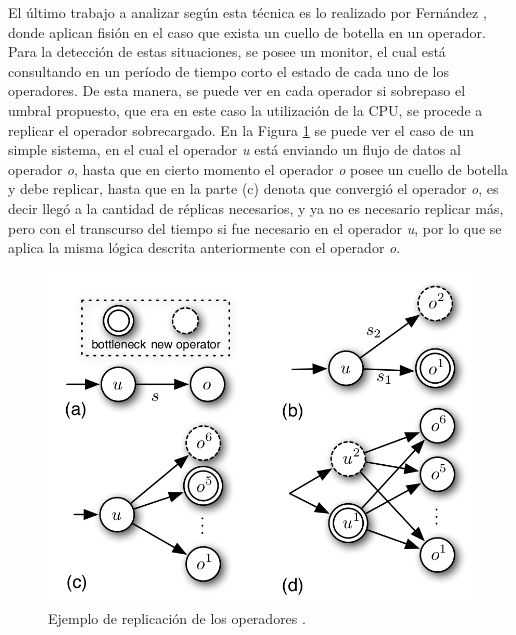 El último trabajo a analizar según esta técnica es lo realizado por Fernández \citep{FernandezMKP13}, donde aplican fisión en el caso que exista un cuello de botella en un operador. Para la detección de estas situaciones, se posee un monitor, el cual está consultando en un período de tiempo corto el estado de cada uno de los operadores. De esta manera, se puede ver en cada operador si sobrepaso el umbral propuesto, que era en este caso la utilización de la CPU, se procede a replicar el operador sobrecargado. En la Figura \ref{fig:ejFision} se puede ver el caso de un simple sistema, en el cual el operador \textit{u} está enviando un flujo de datos al operador \textit{o}, hasta que en cierto momento el operador \textit{o} posee un cuello de botella y debe replicar, hasta que en la parte (c) denota que convergió el operador \textit{o}, es decir llegó a la cantidad de réplicas necesarios, y ya no es necesario replicar más, pero con el transcurso del tiempo si fue necesario en el operador \textit{u}, por lo que se aplica la misma lógica descrita anteriormente con el operador \textit{o}.

\begin{figure}[!ht]
	\centering
	\includegraphics[scale=0.3]{images/EjFision.png}
	\caption{Ejemplo de replicación de los operadores \citep{FernandezMKP13}.}
	\label{fig:ejFision}
\end{figure}

